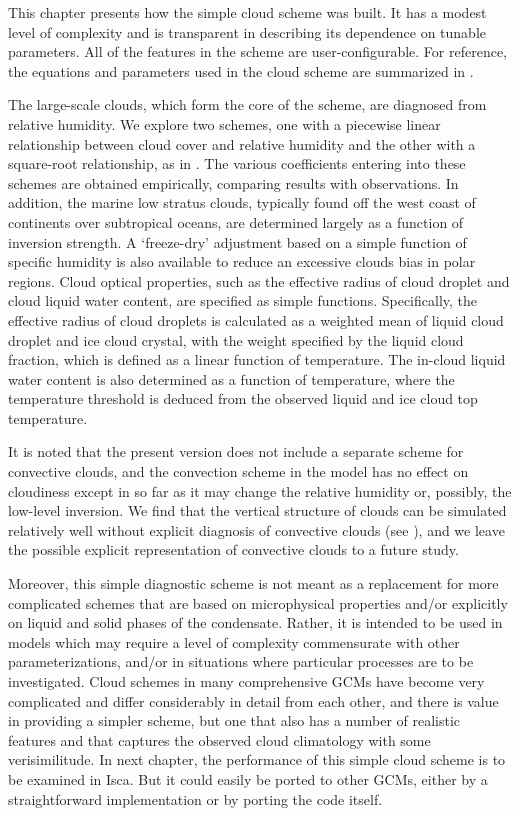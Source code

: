 This chapter presents how the simple cloud scheme was built. It has a modest level of complexity and is transparent in describing its dependence on tunable parameters. All of the features in the scheme are user-configurable. For reference, the equations and parameters used in the cloud scheme are summarized in . 

The large-scale clouds, which form the core of the scheme, are diagnosed from relative humidity. We explore two schemes, one with a piecewise linear relationship between cloud cover and relative humidity and the other with a square-root relationship, as in \cite{Sundqvist1989}. The various coefficients entering into these schemes are obtained empirically, comparing results with observations. In addition, the marine low stratus clouds, typically found off the west coast of continents over subtropical oceans, are determined largely as a function of inversion strength. A `freeze-dry' adjustment based on a simple function of specific humidity is also available to reduce an excessive clouds bias in polar regions. Cloud optical properties, such as the effective radius of cloud droplet and cloud liquid water content, are specified as simple functions. Specifically, the effective radius of cloud droplets is calculated as a weighted mean of liquid cloud droplet and ice cloud crystal, with the weight specified by the liquid cloud fraction, which is defined as a linear function of temperature. The in-cloud liquid water content is also determined as a function of temperature, where the temperature threshold is deduced from the observed liquid and ice cloud top temperature. 

It is noted that the present version does not include a separate scheme for convective clouds, and the convection scheme in the model has no effect on cloudiness except in so far as it may change the relative humidity or, possibly, the low-level inversion. We find that the vertical structure of clouds can be simulated relatively well without explicit diagnosis of convective clouds (see ), and we leave the possible explicit representation of convective clouds to a future study. 

Moreover, this simple diagnostic scheme is not meant as a replacement for more complicated schemes that are based on microphysical properties and/or explicitly on liquid and solid phases of the condensate. Rather, it is intended to be used in models which may require a level of complexity commensurate with other parameterizations, and/or in situations where particular processes are to be investigated. Cloud schemes in many comprehensive GCMs have become very complicated and differ considerably in detail from each other, and there is value in providing a simpler scheme, but one that also has a number of realistic features and that captures the observed cloud climatology with some verisimilitude.  In next chapter, the performance of this simple cloud scheme is to be examined in Isca. But it could easily be ported to other GCMs, either by a straightforward implementation or by porting the code itself.


